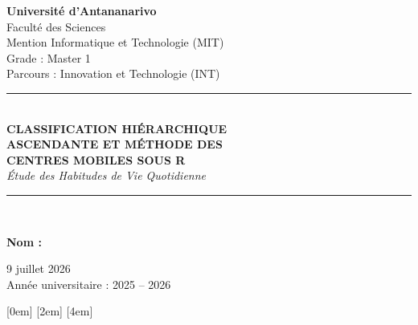 \documentclass[11pt,a4paper]{report}
\begin{document}
	
	\begin{titlepage}
		\centering
		\vspace*{0.5cm}
		
		{\Large\bfseries\color{navy} Université d'Antananarivo}\\[4pt]
		{\large\color{grey} Faculté des Sciences}\\[2pt]
		{\large\color{grey} Mention Informatique et Technologie (MIT)}\\[2pt]
		{\large\color{grey} Grade : Master 1}\\[2pt]
		{\large\color{grey} Parcours : Innovation et Technologie (INT)}\\[1.4cm]
		
		{\color{accent}\rule{0.85\textwidth}{1.4pt}}\\[0.9cm]
		
		{\Huge\bfseries\color{navy} CLASSIFICATION HIÉRARCHIQUE\\[4pt] ASCENDANTE ET MÉTHODE DES\\[4pt] CENTRES MOBILES SOUS R}\\[0.7cm]
		{\Large\itshape\color{accent} Étude des Habitudes de Vie Quotidienne}\\[1cm]
		
		{\color{accent}\rule{0.85\textwidth}{1.4pt}}\\[2.2cm]
		
		\begin{flushleft}
			\hspace{2cm}\textbf{\large Nom :}\\[4pt]
			\hspace{2cm}{\large RABESIHARISON Tolotraniaina Henri}
		\end{flushleft}
		
		\vfill
		
		{\large 9 juillet 2026}\\[4pt]
		{\large Année universitaire : 2025 -- 2026}
		
		\vspace*{0.5cm}
	\end{titlepage}
	
	\pagestyle{plain}
	
	\renewcommand{\contentsname}{\color{navy}Sommaire}
	[0em]
	{\vspace{6pt}\bfseries\color{navy}}
	{\thecontentslabel\quad}{}
	{\hfill\contentspage}
	[2em]
	{\color{accent}}
	{\thecontentslabel\quad}{}
	{\hfill\contentspage}
	[4em]
	{\small\color{grey}}
	{\thecontentslabel\quad}{}
	{\hfill\contentspage}
	
\end{document}
